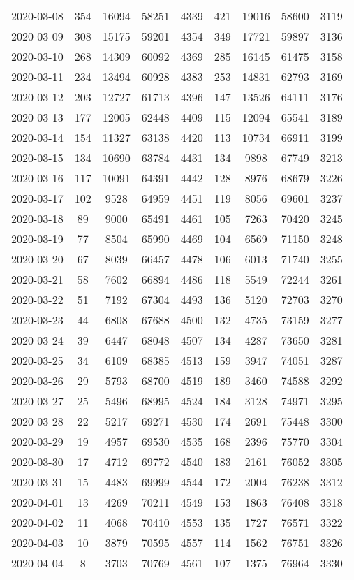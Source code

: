 \begin{longtable}{ccccccccc}
2020-03-08&354&16094&58251&4339&421&19016&58600&3119\\
2020-03-09&308&15175&59201&4354&349&17721&59897&3136\\
2020-03-10&268&14309&60092&4369&285&16145&61475&3158\\
2020-03-11&234&13494&60928&4383&253&14831&62793&3169\\
2020-03-12&203&12727&61713&4396&147&13526&64111&3176\\
2020-03-13&177&12005&62448&4409&115&12094&65541&3189\\
2020-03-14&154&11327&63138&4420&113&10734&66911&3199\\
2020-03-15&134&10690&63784&4431&134&9898&67749&3213\\
2020-03-16&117&10091&64391&4442&128&8976&68679&3226\\
2020-03-17&102&9528&64959&4451&119&8056&69601&3237\\
2020-03-18&89&9000&65491&4461&105&7263&70420&3245\\
2020-03-19&77&8504&65990&4469&104&6569&71150&3248\\
2020-03-20&67&8039&66457&4478&106&6013&71740&3255\\
2020-03-21&58&7602&66894&4486&118&5549&72244&3261\\
2020-03-22&51&7192&67304&4493&136&5120&72703&3270\\
2020-03-23&44&6808&67688&4500&132&4735&73159&3277\\
2020-03-24&39&6447&68048&4507&134&4287&73650&3281\\
2020-03-25&34&6109&68385&4513&159&3947&74051&3287\\
2020-03-26&29&5793&68700&4519&189&3460&74588&3292\\
2020-03-27&25&5496&68995&4524&184&3128&74971&3295\\
2020-03-28&22&5217&69271&4530&174&2691&75448&3300\\
2020-03-29&19&4957&69530&4535&168&2396&75770&3304\\
2020-03-30&17&4712&69772&4540&183&2161&76052&3305\\
2020-03-31&15&4483&69999&4544&172&2004&76238&3312\\
2020-04-01&13&4269&70211&4549&153&1863&76408&3318\\
2020-04-02&11&4068&70410&4553&135&1727&76571&3322\\
2020-04-03&10&3879&70595&4557&114&1562&76751&3326\\
2020-04-04&8&3703&70769&4561&107&1375&76964&3330\\

\end{longtable}
